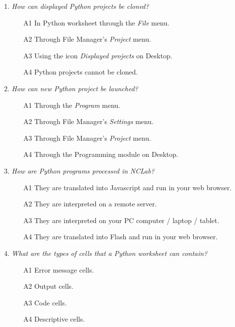 \begin{enumerate}
\item {\em How can displayed Python projects be cloned?}\\

\begin{enumerate}
\item[A1] In Python worksheet through the {\em File} menu.
\item[A2] Through File Manager's {\em Project} menu.
\item[A3] Using the icon {\em Displayed projects} on Desktop.
\item[A4] Python projects cannot be cloned.
\end{enumerate}
\vspace{4mm}

\item {\em How can new Python project be launched?}\\

\begin{enumerate}
\item[A1] Through the {\em Program} menu.
\item[A2] Through File Manager's {\em Settings} menu.
\item[A3] Through File Manager's {\em Project} menu.
\item[A4] Through the Programming module on Desktop.
\end{enumerate}
\vspace{4mm}

\item {\em How are Python programs processed in NCLab?}\\

\begin{enumerate}
\item[A1] They are translated into Javascript and run in your web browser.
\item[A2] They are interpreted on a remote server.
\item[A3] They are interpreted on your PC computer / laptop / tablet.
\item[A4] They are translated into Flash and run in your web browser.
\end{enumerate}
\vspace{4mm}

\item {\em What are the types of cells that a Python worksheet can contain?}\\

\begin{enumerate}
\item[A1] Error message cells.
\item[A2] Output cells.
\item[A3] Code cells.
\item[A4] Descriptive cells.
\end{enumerate}
\vspace{4mm}


\end{enumerate}

